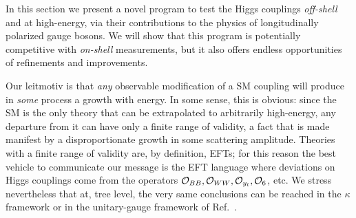 In this section we present a novel program to test the Higgs couplings \emph{off-shell} and at high-energy, via their contributions to the physics of longitudinally polarized gauge bosons. We will show that this program is potentially competitive with \emph{on-shell} measurements, but it also offers endless opportunities of refinements and improvements. 


Our leitmotiv is that \emph{any} observable modification of a SM coupling will produce in \emph{some} process a growth with energy. In some sense, this is obvious: since the SM is the only theory that can be extrapolated to arbitrarily high-energy, any departure from it can have only a finite range of validity, a fact that is made manifest by a disproportionate growth in some scattering amplitude. Theories with a finite range of validity are, by definition, EFTs; for this reason the best vehicle to communicate our message is  the EFT language where deviations on Higgs couplings come from the operators $\mathcal{O}_{BB},\mathcal{O}_{WW},\mathcal{O}_{y_t},\mathcal{O}_{6}$, etc. We stress nevertheless that at, tree level, the very same conclusions can be reached in the $\kappa$ framework \cite{Heinemeyer:2013tqa} or in the unitary-gauge framework of Ref.~\cite{deFlorian:2016spz,Gupta:2014rxa}.



